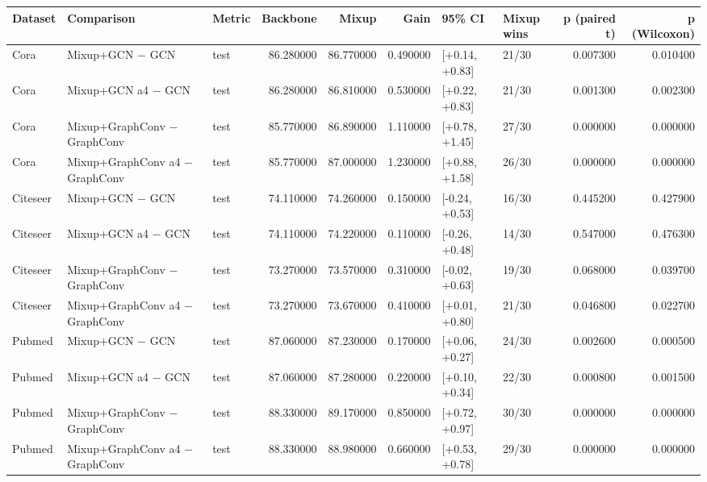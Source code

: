 \begin{tabular}{lllrrrllrr}
\toprule
Dataset & Comparison & Metric & Backbone & Mixup & Gain & 95\% CI & Mixup wins & p (paired t) & p (Wilcoxon) \\
\midrule
Cora & Mixup+GCN − GCN & test & 86.280000 & 86.770000 & 0.490000 & [+0.14, +0.83] & 21/30 & 0.007300 & 0.010400 \\
Cora & Mixup+GCN a4 − GCN & test & 86.280000 & 86.810000 & 0.530000 & [+0.22, +0.83] & 21/30 & 0.001300 & 0.002300 \\
Cora & Mixup+GraphConv − GraphConv & test & 85.770000 & 86.890000 & 1.110000 & [+0.78, +1.45] & 27/30 & 0.000000 & 0.000000 \\
Cora & Mixup+GraphConv a4 − GraphConv & test & 85.770000 & 87.000000 & 1.230000 & [+0.88, +1.58] & 26/30 & 0.000000 & 0.000000 \\
Citeseer & Mixup+GCN − GCN & test & 74.110000 & 74.260000 & 0.150000 & [-0.24, +0.53] & 16/30 & 0.445200 & 0.427900 \\
Citeseer & Mixup+GCN a4 − GCN & test & 74.110000 & 74.220000 & 0.110000 & [-0.26, +0.48] & 14/30 & 0.547000 & 0.476300 \\
Citeseer & Mixup+GraphConv − GraphConv & test & 73.270000 & 73.570000 & 0.310000 & [-0.02, +0.63] & 19/30 & 0.068000 & 0.039700 \\
Citeseer & Mixup+GraphConv a4 − GraphConv & test & 73.270000 & 73.670000 & 0.410000 & [+0.01, +0.80] & 21/30 & 0.046800 & 0.022700 \\
Pubmed & Mixup+GCN − GCN & test & 87.060000 & 87.230000 & 0.170000 & [+0.06, +0.27] & 24/30 & 0.002600 & 0.000500 \\
Pubmed & Mixup+GCN a4 − GCN & test & 87.060000 & 87.280000 & 0.220000 & [+0.10, +0.34] & 22/30 & 0.000800 & 0.001500 \\
Pubmed & Mixup+GraphConv − GraphConv & test & 88.330000 & 89.170000 & 0.850000 & [+0.72, +0.97] & 30/30 & 0.000000 & 0.000000 \\
Pubmed & Mixup+GraphConv a4 − GraphConv & test & 88.330000 & 88.980000 & 0.660000 & [+0.53, +0.78] & 29/30 & 0.000000 & 0.000000 \\
\bottomrule
\end{tabular}
